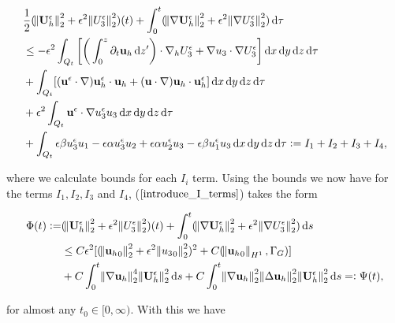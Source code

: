 \documentclass[11pt]{article}
\newcommand*\diff{\mathop{}\!\mathrm{d}}
\begin{document}
  \begin{equation} \label{introduce_I_terms}
    \begin{split}
      & \frac{1}{2} (\norm{\mathbf{U}_h^\epsilon}_2^2 + \epsilon^2 \norm{U_3^\epsilon}_2^2) (t) + \int_0^{t} (\norm{\nabla \mathbf{U}_h^\epsilon}_2^2 + \epsilon^2 \norm{\nabla U_3^\epsilon}_2^2) \diff \tau  \\
      & \leq - \epsilon^2 \int_{Q_t} \bigg [ \bigg ( \int_0^z \partial_t \mathbf{u}_h \diff z' \bigg ) \cdot \nabla_h U_3^\epsilon + \nabla u_3 \cdot \nabla U_3^\epsilon \bigg ] \diff x \diff y \diff z \diff \tau \\
      & + \int_{Q_t} [(\mathbf{u}^\epsilon \cdot \nabla) \mathbf{u}_h^\epsilon \cdot \mathbf{u}_h + (\mathbf{u} \cdot \nabla )\mathbf{u}_h \cdot \mathbf{u}_h^\epsilon] \diff x \diff y \diff z \diff \tau \\
      & + \epsilon^2 \int_{Q_t} \mathbf{u}^\epsilon \cdot \nabla u_3^\epsilon u_3 \diff x \diff y \diff z \diff \tau \\
      & + \int_{Q_t}  \epsilon \beta u_3^\epsilon u_1 - \epsilon \alpha u_3^\epsilon u_2 + \epsilon \alpha u_2^\epsilon u_3 - \epsilon \beta u_1^\epsilon u_3 \diff x \diff y \diff z \diff \tau := I_1 + I_2 + I_3 + I_4, \raisetag{80pt}
    \end{split}
  \end{equation}
  
where we calculate bounds for each $I_i$ term. Using the bounds we now have for the terms $I_1, I_2, I_3$ and $I_4$, ($\ref{introduce_I_terms}$) takes the form

\begin{equation}
  \begin{split} \nonumber
  \Phi (t):= & (\norm{\mathbf{U}_h^\epsilon}_2^2 + \epsilon^2 \norm{U_3^\epsilon}_2^2)(t) + \int_0^t (\norm{\nabla \mathbf{U}_h^\epsilon}_2^2 + \epsilon^2 \norm{\nabla U_3^\epsilon}_2^2) \diff s \\
  & \leq C \epsilon^2 [(\norm{{\mathbf{u}_h}_0}_2^2 + \epsilon^2 \norm{{u_3}_0}_2^2)^2 + C(\norm{{\mathbf{u}_h}_0}_{H^1}, \Gamma_G)] \\
  & + C \int_0^{t} \norm{\nabla \mathbf{u}_h}_2^4 \norm{\mathbf{U}_h^\epsilon}_2^2 \diff s + C \int_0^{t} \norm{\nabla \mathbf{u}_h}_2^2  \norm{\Delta \mathbf{u}_h}_2^2 \norm{\mathbf{U}_h^\epsilon}_2^2 \diff s =: \Psi(t),
  \end{split}
\end{equation}

for almost any $t_0 \in [0, \infty).$ With this we have
\end{document}
